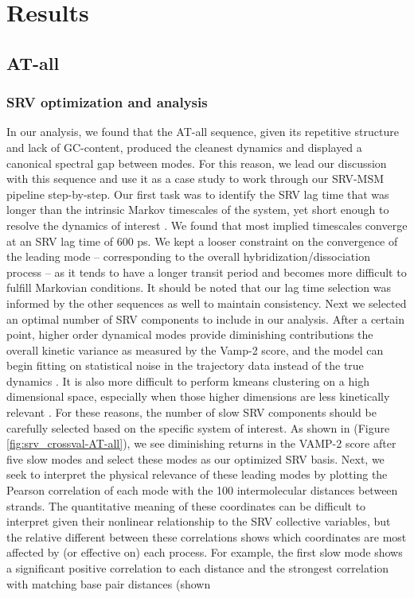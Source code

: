 \documentclass[journal=jpcbfk,manuscript=article]{achemso}
\begin{document}

\section{\label{sec:Results}Results}

\subsection{\label{sec:Results}AT-all}

\subsubsection{\label{sec:Results}SRV optimization and analysis}

In our analysis, we found that the AT-all sequence, given its repetitive structure and lack of GC-content, produced the cleanest dynamics and displayed a canonical spectral gap between modes. For this reason, we lead our discussion with this sequence and use it as a case study to work through our SRV-MSM pipeline step-by-step. Our first task was to identify the SRV lag time that was longer than the intrinsic Markov timescales of the system, yet short enough to resolve the dynamics of interest \citep{Phys2018MarkovValidation}. We found that most implied timescales converge at an SRV lag time of 600 ps. We kept a looser constraint on the convergence of the leading mode -- corresponding to the overall hybridization/dissociation process -- as it tends to have a longer transit period and becomes more difficult to fulfill Markovian conditions. It should be noted that our lag time selection was informed by the other sequences as well to maintain consistency. Next we selected an optimal number of SRV components to include in our analysis. After a certain point, higher order dynamical modes provide diminishing contributions the overall kinetic variance as measured by the Vamp-2 score, and the model can begin fitting on statistical noise in the trajectory data instead of the true dynamics \citep{McGibbon2015VariationalKinetics}. It is also more difficult to perform kmeans clustering on a high dimensional space, especially when those higher dimensions are less kinetically relevant \citep{Pande2010EverythingAsk}. For these reasons, the number of slow SRV components should be carefully selected based on the specific system of interest. As shown in (Figure \ref{fig:srv_crossval-AT-all}), we see diminishing returns in the VAMP-2 score after five slow modes and select these modes as our optimized SRV basis. Next, we seek to interpret the physical relevance of these leading modes by plotting the Pearson correlation of each mode with the 100 intermolecular distances between strands. The quantitative meaning of these coordinates can be difficult to interpret given their nonlinear relationship to the SRV collective variables, but the relative different between these correlations shows which coordinates are most affected by (or effective on) each process. For example, the first slow mode shows a significant positive correlation to each distance and the strongest correlation with matching base pair distances (shown 
\end{document}
